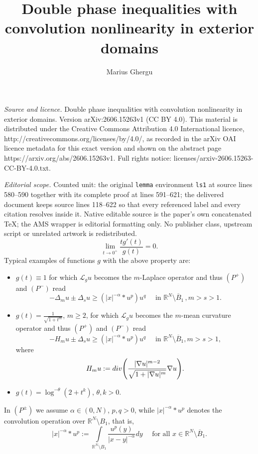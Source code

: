 \documentclass[10pt,a4paper]{amsart}
\numberwithin{equation}{section}
\newcommand{\R}{\mathbb R}
\newcommand{\Ro}{\mathbb R^N\setminus \overline B_1}
\newcommand{\Lg}{{\mathcal L}_g}
\begin{document}
\title[Double phase inequalities with convolution nonlinearity in e]{Double phase inequalities with convolution nonlinearity in exterior domains}
\author{Marius Ghergu}
\date{}
\maketitle
\noindent\emph{Source and licence.} Double phase inequalities with convolution nonlinearity in exterior domains. Version arXiv:2606.15263v1 (CC BY 4.0). This material is distributed under the Creative Commons Attribution 4.0 International licence, http://creativecommons.org/licenses/by/4.0/, as recorded in the arXiv OAI licence metadata for this exact version and shown on the abstract page https://arxiv.org/abs/2606.15263v1. Full rights notice: licenses/arxiv-2606.15263-CC-BY-4.0.txt.\par\smallskip
\noindent\textit{Editorial scope.} Counted unit: the original \texttt{lemma} environment \texttt{ls1} at source lines 580--590 together with its complete proof at lines 591--621; the delivered document keeps source lines 118--622 so that every referenced label and every citation resolves inside it. Native editable source is the paper's own concatenated TeX; the AMS wrapper is editorial formatting only. No publisher class, upstream script or unrelated artwork is redistributed.
\begin{equation}\label{cong}
\lim_{t\to 0^+}\frac{tg'(t)}{g(t)}=0.
\end{equation}
Typical examples of functions $g$ with the above property are:
\begin{itemize} 
\item $g(t)\equiv 1$ for which $\Lg u$ becomes the $m$-Laplace operator and thus $(P^+)$ and $(P^-)$ read 
\begin{equation}\label{lap1}
-\Delta_m u\pm \Delta_s u\geq (|x|^{-\alpha}*u^p)u^q \quad\mbox{ in }\Ro\, , m>s>1.
\end{equation}


\item $g(t)=\frac{1}{\sqrt{1+t^m}}$, $m\geq 2$, for which $\Lg u$ becomes the $m$-mean curvature operator and thus $(P^+)$ and $(P^-)$ read 
\begin{equation}\label{lap2}
-H_m u\pm \Delta_s u\geq (|x|^{-\alpha}*u^p)u^q \quad\mbox{ in }\Ro, m>s>1,
\end{equation}
where 
\begin{equation}\label{mcv}
H_m u:={\rm div}\Bigg( \frac{|\nabla u|^{m-2}}{\sqrt{1+|\nabla u|^m}}\nabla u\Bigg).
\end{equation}
\item $g(t)=\log^{-\theta}(2+t^k) $, $\theta, k>0$.
\end{itemize} 
In $(P^\pm)$ we assume $\alpha\in (0, N)$, $p, q>0$, while $|x|^{-\alpha}*u^p$ denotes the convolution operation over $\R^N\setminus B_1$, that is,
$$ 
|x|^{-\alpha}*u^p:=\int\limits_{\R^N\setminus B_1} \frac{u^p(y)}{|x-y|^{-\alpha}} dy \quad\mbox{ for all }x\in \Ro. 
$$ 
\end{document}
